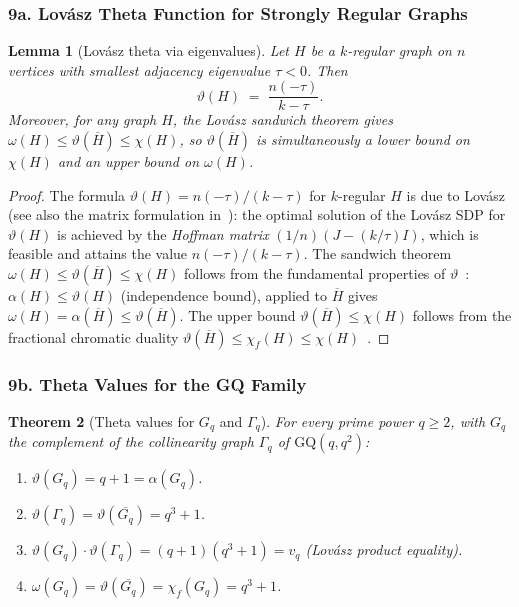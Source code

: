\documentclass{article}
\newtheorem{theorem}{Theorem}[section]
\newtheorem{lemma}[theorem]{Lemma}
\theoremstyle{definition}
\begin{document}
\subsubsection*{9a. Lov\'asz Theta Function for Strongly Regular Graphs}

\begin{lemma}[Lov\'asz theta via eigenvalues]\label{lem:theta-srg}
Let $H$ be a $k$-regular graph on $n$ vertices with smallest adjacency eigenvalue $\tau<0$.  Then
\[
  \vartheta(H) \;=\; \frac{n(-\tau)}{k-\tau}.
\]
Moreover, for any graph $H$, the \emph{Lov\'asz sandwich theorem} gives
$\omega(H)\le\vartheta(\overline{H})\le\chi(H)$,
so $\vartheta(\overline{H})$ is simultaneously a lower bound on $\chi(H)$ and an upper bound on $\omega(H)$.
\end{lemma}

\begin{proof}
The formula $\vartheta(H)=n(-\tau)/(k-\tau)$ for $k$-regular $H$ is due to Lov\'asz~\cite{Lovasz1979} (see also the matrix formulation in~\cite{BvM2022}): the optimal solution of the Lov\'asz SDP for $\vartheta(H)$ is achieved by the \emph{Hoffman matrix} $(1/n)(J - (k/\tau)I)$, which is feasible and attains the value $n(-\tau)/(k-\tau)$.  The sandwich theorem $\omega(H)\le\vartheta(\overline{H})\le\chi(H)$ follows from the fundamental properties of $\vartheta$~\cite{Lovasz1979}: $\alpha(H)\le\vartheta(H)$ (independence bound), applied to $\overline{H}$ gives $\omega(H)=\alpha(\overline{H})\le\vartheta(\overline{H})$.  The upper bound $\vartheta(\overline{H})\le\chi(H)$ follows from the fractional chromatic duality $\vartheta(\overline{H})\le\chi_f(H)\le\chi(H)$~\cite{Lovasz1979}.
\end{proof}

\subsubsection*{9b. Theta Values for the GQ Family}

\begin{theorem}[Theta values for $G_q$ and $\Gamma_q$]\label{thm:theta-gq}
For every prime power $q\ge 2$, with $G_q$ the complement of the collinearity graph $\Gamma_q$ of $\mathrm{GQ}(q,q^2)$:
\begin{enumerate}
  \item[\textup{(a)}] $\vartheta(G_q) = q+1 = \alpha(G_q)$.
  \item[\textup{(b)}] $\vartheta(\Gamma_q) = \vartheta(\overline{G_q}) = q^3+1$.
  \item[\textup{(c)}] $\vartheta(G_q)\cdot\vartheta(\Gamma_q) = (q+1)(q^3+1) = v_q$ (Lov\'asz product equality).
  \item[\textup{(d)}] $\omega(G_q) = \vartheta(\overline{G_q}) = \chi_f(G_q) = q^3+1$.
\end{enumerate}
\end{theorem}
\end{document}
